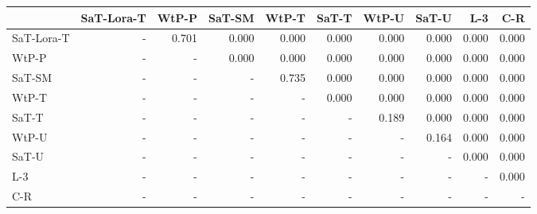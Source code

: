 \begin{tabular}{lrrrrrrrrr}
\toprule
 & SaT-Lora-T & WtP-P & SaT-SM & WtP-T & SaT-T & WtP-U & SaT-U & L-3 & C-R \\
\midrule
SaT-Lora-T & - & 0.701 & 0.000 & 0.000 & 0.000 & 0.000 & 0.000 & 0.000 & 0.000 \\
WtP-P & - & - & 0.000 & 0.000 & 0.000 & 0.000 & 0.000 & 0.000 & 0.000 \\
SaT-SM & - & - & - & 0.735 & 0.000 & 0.000 & 0.000 & 0.000 & 0.000 \\
WtP-T & - & - & - & - & 0.000 & 0.000 & 0.000 & 0.000 & 0.000 \\
SaT-T & - & - & - & - & - & 0.189 & 0.000 & 0.000 & 0.000 \\
WtP-U & - & - & - & - & - & - & 0.164 & 0.000 & 0.000 \\
SaT-U & - & - & - & - & - & - & - & 0.000 & 0.000 \\
L-3 & - & - & - & - & - & - & - & - & 0.000 \\
C-R & - & - & - & - & - & - & - & - & - \\
\bottomrule
\end{tabular}

